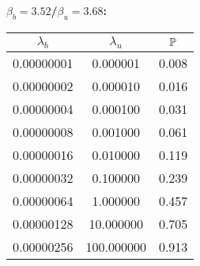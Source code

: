 \begin{minipage}{.3\textwidth}
	{\bf \(\beta_b=3.52\)/\(\beta_u=3.68\):}
	\begin{tabular}{|c|c|c|}
	\(\lambda_b\) & \(\lambda_u\) & \(\P\) \\ \hline
	0.00000001 & 0.000001 & 0.008 \\ \hline
	0.00000002 & 0.000010 & 0.016 \\ \hline
	0.00000004 & 0.000100 & 0.031 \\ \hline
	0.00000008 & 0.001000 & 0.061 \\ \hline
	0.00000016 & 0.010000 & 0.119 \\ \hline
	0.00000032 & 0.100000 & 0.239 \\ \hline
	0.00000064 & 1.000000 & 0.457 \\ \hline
	0.00000128 & 10.000000 & 0.705 \\ \hline
	0.00000256 & 100.000000 & 0.913 \\ \hline
	\end{tabular}
\end{minipage}

